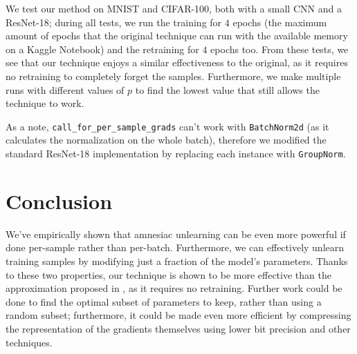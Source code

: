 \documentclass{article}
\begin{document}
We test our method on MNIST and CIFAR-100, both with a small CNN and a ResNet-18; during all tests, we run the training for $4$ epochs (the maximum amount of epochs that the original technique can run with the available memory on a Kaggle Notebook) and the retraining for $4$ epochs too. From these tests, we see that our technique enjoys a similar effectiveness to the original, as it requires no retraining to completely forget the samples. Furthermore, we make multiple runs with different values of $p$ to find the lowest value that still allows the technique to work.

As a note, \texttt{call\_for\_per\_sample\_grads} can't work with \texttt{BatchNorm2d} (as it calculates the normalization on the whole batch), therefore we modified the standard ResNet-18 implementation by replacing each instance with \texttt{GroupNorm}.

\section{Conclusion}
We've empirically shown that amnesiac unlearning can be even more powerful if done per-sample rather than per-batch. Furthermore, we can effectively unlearn training samples by modifying just a fraction of the model's parameters. Thanks to these two properties, our technique is shown to be more effective than the approximation proposed in \cite{gogineni2024efficient}, as it requires no retraining. Further work could be done to find the optimal subset of parameters to keep, rather than using a random subset; furthermore, it could be made even more efficient by compressing the representation of the gradients themselves using lower bit precision and other techniques.



\end{document}
